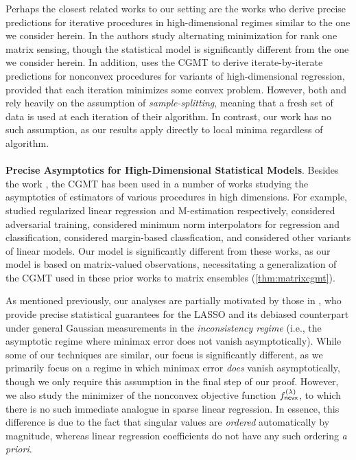 \documentclass[10pt]{article}
\theoremstyle{definition}
\begin{document}
Perhaps the closest related works to our setting are the works \citet{chandrasekher_alternating_2024,chandrasekher_sharp_2023} who derive precise predictions for iterative procedures in high-dimensional regimes similar to the one we consider herein. In \citet{chandrasekher_alternating_2024} the authors study alternating minimization for rank one matrix sensing, though the statistical model is significantly different from the one we consider herein.  In addition,  \citet{chandrasekher_sharp_2023} uses the CGMT to derive iterate-by-iterate predictions for nonconvex procedures for variants of high-dimensional regression, provided that each iteration minimizes some convex problem.  
However, both \citet{chandrasekher_alternating_2024} and \citet{chandrasekher_sharp_2023} rely heavily on the assumption of \emph{sample-splitting}, meaning that a fresh set of data is used at each iteration of their algorithm.  In contrast, our work has no such assumption, as our results apply directly to local minima regardless of  algorithm.  
\\ \ \\
\noindent
\textbf{Precise Asymptotics for High-Dimensional Statistical Models}.  Besides the work \citet{chandrasekher_sharp_2023}, the CGMT has been used in a number of works studying the asymptotics of estimators of various procedures in high dimensions. 
For example, \citet{thrampoulidis_regularized_2015,thrampoulidis_precise_2018} studied  regularized linear regression and M-estimation respectively, \citet{javanmard_precise_2020,javanmard_precise_2022} considered adversarial training, \citet{liang_precise_2022,donhauser_fast_2022,wang_tight_2022,stojanovic_tight_2024,han_distribution_2023} considered minimum norm interpolators for regression and classification, \citet{montanari_generalization_2025} considered margin-based classfication, and \citet{taheri_sharp_2020,taheri_fundamental_2021,han_noisy_2023,loureiro_learning_2021,salehi_impact_2019} considered other variants of linear models.  Our model is significantly different from these works, as our model is based on matrix-valued observations, necessitating a generalization of the CGMT used in these prior works to matrix ensembles (\cref{thm:matrixcgmt}).  


As mentioned previously, our analyses are partially motivated by those in \citet{celentano_lasso_2023}, who provide precise statistical guarantees for the LASSO and its debiased counterpart under general Gaussian measurements in the \emph{inconsistency regime} (i.e., the asymptotic regime where minimax error does not vanish asymptotically).  While some of our techniques are similar, our focus is significantly different, as we primarily focus on a regime in which minimax error \emph{does} vanish asymptotically, though we only require this assumption in the final step of our proof.  
However, we also study the minimizer of the nonconvex objective function $f_{{\sf ncvx}}^{(\lambda)}$, to which there is no such immediate analogue in sparse linear regression. In essence, this difference is due to the fact that singular values are \emph{ordered} automatically by magnitude, whereas linear regression coefficients do not have any such ordering \emph{a priori}.
\end{document}
